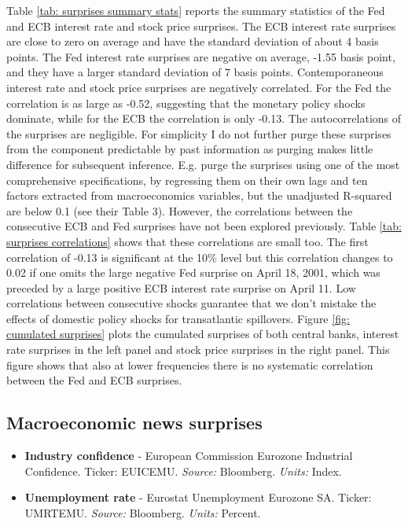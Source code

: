 \documentclass[a4paper,12pt]{article}
\begin{document}
Table \ref{tab: surprises summary stats} reports the summary statistics of the Fed and ECB
interest rate and stock price surprises.
The ECB interest rate surprises are close to zero on average and have the standard deviation of about 4 basis points. The Fed interest rate surprises are negative on average, -1.55 basis point, and they have a larger standard deviation of 7 basis points. 
Contemporaneous interest rate and stock price surprises are negatively correlated.
For the Fed the correlation is as large as -0.52, suggesting that the monetary policy shocks
dominate, while for the ECB the correlation is only -0.13.
The autocorrelations of the surprises are negligible.
For simplicity I do not further purge these surprises from the component predictable by past information as purging makes little difference for subsequent inference. E.g. \cite{MirandaAgrippino_Ricco_2021} purge the surprises using one of the most comprehensive specifications, by regressing them on
their own lags and ten factors extracted from macroeconomics variables, but the unadjusted R-squared are below 0.1 (see their Table 3).
However, the correlations between the consecutive ECB and Fed surprises have not been explored previously.
Table \ref{tab: surprises correlations} shows that these correlations are small too. The first correlation of -0.13 is significant at the 10\% level but this correlation changes to 0.02
if one omits the large negative Fed surprise on April 18, 2001, which was preceded by a large positive ECB interest rate surprise on April 11.
Low correlations between consecutive shocks guarantee that we don't mistake the effects of domestic policy shocks for transatlantic spillovers.
Figure \ref{fig: cumulated surprises} plots the cumulated surprises of both central banks, interest rate surprises in the left panel and stock price surprises in the right panel. This figure shows that also at lower frequencies there is no systematic correlation between the Fed and ECB surprises.


\subsection{Macroeconomic news surprises}

\begin{itemize}
\item \textbf{Industry confidence} - European Commission Eurozone Industrial Confidence. Ticker: EUICEMU. \emph{Source:} Bloomberg. \emph{Units:} Index.
\item \textbf{Unemployment rate} - Eurostat Unemployment Eurozone SA. Ticker: UMRTEMU. \emph{Source:} Bloomberg. \emph{Units:} Percent.
\end{itemize}
\end{document}
